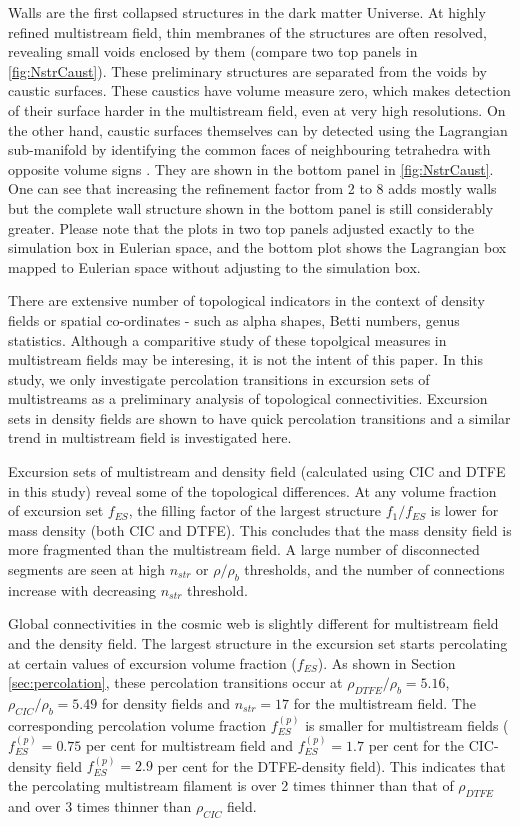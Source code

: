 Walls are the first collapsed structures in the dark matter Universe. At highly refined multistream field, thin membranes of the structures are often resolved, revealing small voids enclosed by them (compare two top panels in \autoref{fig:NstrCaust}). These preliminary structures are separated from the voids by caustic surfaces. These caustics have volume measure zero, which makes detection of their surface harder in the multistream field, even at very high resolutions. On the other hand, caustic surfaces themselves can by detected using the Lagrangian sub-manifold by identifying the common faces of neighbouring tetrahedra 
with opposite volume signs \citep{Shandarin2012}. They are shown in the bottom panel in  \autoref{fig:NstrCaust}. One can see that increasing the refinement factor from 2 to 8 adds mostly walls but the complete wall structure shown in the bottom panel is still considerably greater. Please note that the plots in  two top panels adjusted  exactly to the simulation box in Eulerian space, and the bottom plot shows the Lagrangian box mapped to Eulerian space without adjusting to the simulation box.

There are extensive number of topological indicators in the context of density fields or spatial co-ordinates - such as alpha shapes, Betti numbers, genus statistics. Although a comparitive study of these topolgical measures in multistream fields may be interesing, it is not the intent of this paper. In this study, we only investigate percolation transitions in excursion sets of multistreams as a preliminary analysis of topological connectivities. Excursion sets in density fields are shown to have quick percolation transitions \citep{Shandarin2010b} and a similar trend in multistream field is investigated here.


Excursion sets of multistream and density field (calculated using CIC and DTFE in this study) reveal some of the topological differences. At any volume fraction of excursion set $f_{ES}$, the filling factor of the largest structure $f_{1}/f_{ES}$ is lower for mass density (both CIC and DTFE). This concludes that the mass density field is more fragmented than the multistream field. A large number of disconnected segments are seen at high $n_{str}$ or $\rho/ \rho_b$ thresholds, and the number of connections increase with decreasing $n_{str}$ threshold.
  

Global connectivities in the cosmic web is slightly different for multistream field and the density field. The largest structure in the excursion set starts percolating at certain values of excursion volume fraction ($f_{ES}$). As shown in Section \ref{sec:percolation}, these percolation transitions occur at $\rho_{DTFE}/ \rho_b = 5.16 $, $\rho_{CIC}/ \rho_b = 5.49 $ for density fields and $n_{str} = 17$ for the multistream field. The corresponding percolation volume fraction $f_{ES}^{(p)}$ is smaller for multistream fields ( $f_{ES}^{(p)} = 0.75$  per cent for multistream field and $f_{ES}^{(p)} = 1.7$ per cent for the CIC-density field $f_{ES}^{(p)} = 2.9$ per cent for the DTFE-density field). This indicates that the percolating multistream filament is over 2 times thinner than that of $\rho_{DTFE}$ and over 3 times thinner than $\rho_{CIC}$ field. 

